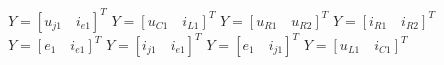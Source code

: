 $Y=[u_{j1} \quad i_{e1}]^T$
$Y=[u_{C1} \quad i_{L1}]^T$
$Y=[u_{R1} \quad u_{R2}]^T$
$Y=[i_{R1} \quad i_{R2}]^T$
$Y=[e_1 \quad i_{e1}]^T$
$Y=[i_{j1} \quad i_{e1}]^T$
$Y=[e_{1} \quad i_{j1}]^T$
$Y=[u_{L1} \quad i_{C1}]^T$
